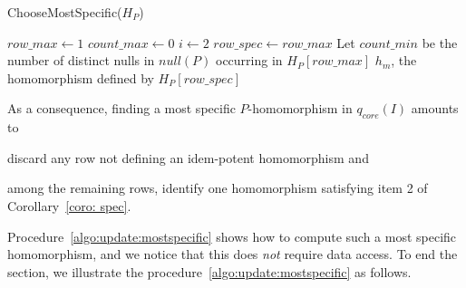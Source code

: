 \begin{procedure}[htb]
    \caption{ChooseMostSpecific($H_P$)}
    \label{algo:update:mostspecific}


    $row\_max \gets 1$ \; $count\_max \gets 0$ \; $i \gets 2$\;
    $row\_spec \gets row\_max$\label{assign:row-spec1}\;
    Let $count\_min$ be the number of distinct nulls in $null(P)$ occurring in $H_P[row\_max]$\label{assing:row-min}\;
    \Return $h_m$, the homomorphism defined by $H_P[row\_spec]$ \;
\end{procedure}

As a consequence, finding a most specific $P$-homomorphism in $q_{core}(I)$ amounts to
\begin{enumerate*}[label=(\roman*)]
    \item discard any row not defining an idem-potent homomorphism and
    \item among the remaining rows, identify one homomorphism satisfying item 2 of Corollary~\ref{coro: spec}.
\end{enumerate*}
Procedure~\ref{algo:update:mostspecific} shows how to compute such a most specific homomorphism, and we notice that this does \emph{not} require data access.
To end the section, we illustrate the procedure~\ref{algo:update:mostspecific} as follows.

